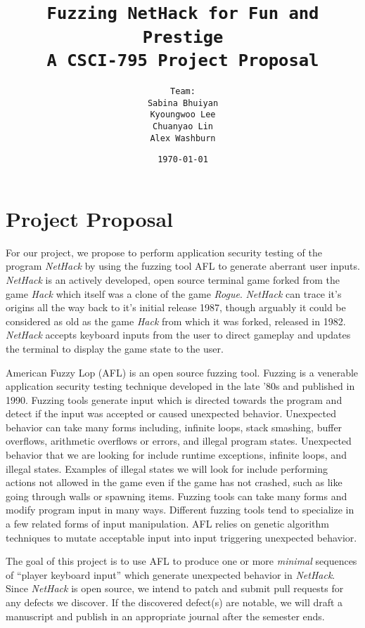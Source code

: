 \documentclass[12pt]{diazessay}
\title{\texttt{\huge{Fuzzing NetHack for Fun and Prestige} \\ {\large A CSCI-795 Project Proposal}}} %
\author{\texttt{{\Huge Team:}\\\vspace*{-0.5em} 
		Sabina Bhuiyan \\\vspace*{-0.5em} 
		Kyoungwoo Lee \\\vspace*{-0.5em}
		Chuanyao Lin \\\vspace*{-0.25em}
		Alex Washburn}} %
\date{\texttt{\today}} %
\begin{document}
\maketitle %

\section*{Project Proposal}

For our project, we propose to perform application security testing of the program \emph{NetHack} by using the fuzzing tool AFL to generate aberrant user inputs. 
\emph{NetHack} is an actively developed, open source terminal game forked from the game \emph{Hack} which itself was a clone of the game \emph{Rogue}. 
\emph{NetHack} can trace it's origins all the way back to it's initial release 1987, though arguably it could be considered as old as the game \emph{Hack} from which it was forked, released in 1982. 
\emph{NetHack} accepts keyboard inputs from the user to direct gameplay and updates the terminal to display the game state to the user.

American Fuzzy Lop (AFL) is an open source fuzzing tool.
Fuzzing is a venerable application security testing technique developed in the late '80s and published in 1990.
Fuzzing tools generate input which is directed towards the program and detect if the input was accepted or caused unexpected behavior.
Unexpected behavior can take many forms including, infinite loops, stack smashing, buffer overflows, arithmetic overflows or errors, and illegal program states.
Unexpected behavior that we are looking for include runtime exceptions, infinite loops, and illegal states.
Examples of illegal states we will look for include performing actions not allowed in the game even if the game has not crashed, such as like going through walls or spawning items.
Fuzzing tools can take many forms and modify program input in many ways.
Different fuzzing tools tend to specialize in a few related forms of input manipulation.
AFL relies on genetic algorithm techniques to mutate acceptable input into input triggering unexpected behavior.

The goal of this project is to use AFL to produce one or more \emph{minimal} sequences of ``player keyboard input'' which generate unexpected behavior in \emph{NetHack}.
Since \emph{NetHack} is open source, we intend to patch and submit pull requests for any defects we discover.
If the discovered defect(s) are notable, we will draft a manuscript and publish in an appropriate journal after the semester ends.
\end{document}
